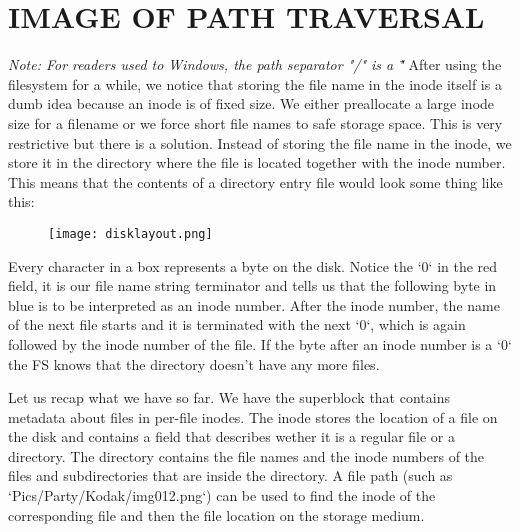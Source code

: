 \section{IMAGE OF PATH TRAVERSAL}

\textit{Note: For readers used to Windows, the path separator "/" is a "\"}
After using the filesystem for a while, we notice that storing the file name in the inode itself is a
dumb idea because an inode is of fixed size. We either preallocate a large inode size for a filename
or we force short file names to safe storage space. This is very restrictive but there is a solution.
Instead of storing the file name in the inode, we store it in the directory where the file is located
together with the inode number. This means that the contents of a directory entry file would look some
thing like this:

\begin{figure}[h]
	\texttt{[image: disklayout.png]}
	\centering
\end{figure}

Every character in a box represents a byte on the disk. Notice the `0` in the red field,
it is our file name string terminator and tells us that the following byte in blue is to be interpreted
as an inode number. After the inode number, the name of the next file starts and it is terminated with the next `0`, which is again
followed by the inode number of the file. If the byte after an inode number is a `0` the FS knows
that the directory doesn't have any more files.

Let us recap what we have so far.
We have the superblock that contains metadata about files in per-file inodes. The inode stores the
location of a file on the disk and contains a field that describes wether it is a regular file or a
directory. The directory contains the file names and the inode numbers of the files and subdirectories
that are inside the directory. A file path (such as `Pics/Party/Kodak/img012.png`) can
be used to find the inode of the corresponding file and then the file location on the storage medium.

